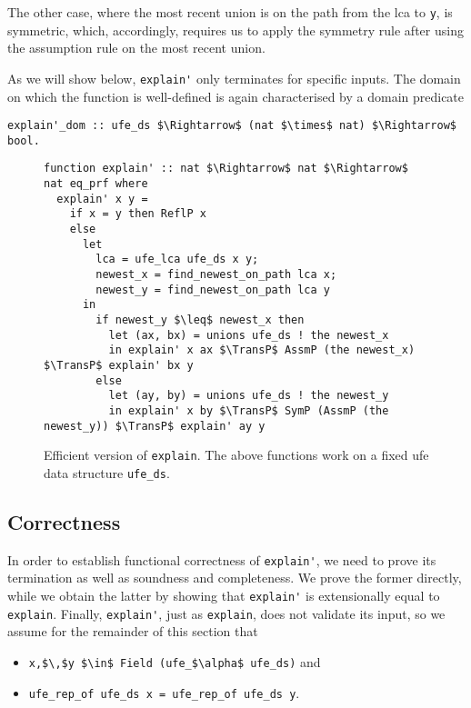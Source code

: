 \documentclass[
  sigplan,
  10pt,
  anonymous,
  review,
  ]{acmart}
\newcommand{\TransP}{\bigtriangledown}
\begin{document}
The other case, where the most recent union is on the path from the \acrshort{lca} to \lstinline|y|, is symmetric, which, accordingly, requires us to apply the symmetry rule after using the assumption rule on the most recent union.

As we will show below, \lstinline|explain'| only terminates for specific inputs.
The domain on which the function is well-defined is again characterised by a domain predicate
\begin{lstlisting}
explain'_dom :: ufe_ds $\Rightarrow$ (nat $\times$ nat) $\Rightarrow$ bool.
\end{lstlisting}
\begin{figure*}
  \centering
  \begin{lstlisting}
function explain' :: nat $\Rightarrow$ nat $\Rightarrow$ nat eq_prf where
  explain' x y =
    if x = y then ReflP x
    else
      let
        lca = ufe_lca ufe_ds x y;
        newest_x = find_newest_on_path lca x;
        newest_y = find_newest_on_path lca y
      in
        if newest_y $\leq$ newest_x then
          let (ax, bx) = unions ufe_ds ! the newest_x
          in explain' x ax $\TransP$ AssmP (the newest_x) $\TransP$ explain' bx y
        else
          let (ay, by) = unions ufe_ds ! the newest_y
          in explain' x by $\TransP$ SymP (AssmP (the newest_y)) $\TransP$ explain' ay y
  \end{lstlisting}
  \caption{Efficient version of \lstinline|explain|. The above functions work on a fixed \acrshort{ufe} data structure \lstinline|ufe_ds|.\label{fig:explain'}}
\end{figure*}

\subsection{Correctness}
In order to establish functional correctness of \lstinline|explain'|, we need to prove its termination as well as soundness and completeness.
We prove the former directly, while we obtain the latter by showing that \lstinline|explain'| is extensionally equal to \lstinline|explain|.
Finally, \lstinline|explain'|, just as \lstinline|explain|, does not validate its input, so we assume for the remainder of this section that
\begin{itemize}
  \item \lstinline|x,$\,$y $\in$ Field (ufe_$\alpha$ ufe_ds)| and
  \item \lstinline|ufe_rep_of ufe_ds x = ufe_rep_of ufe_ds y|.
\end{itemize}
\end{document}
